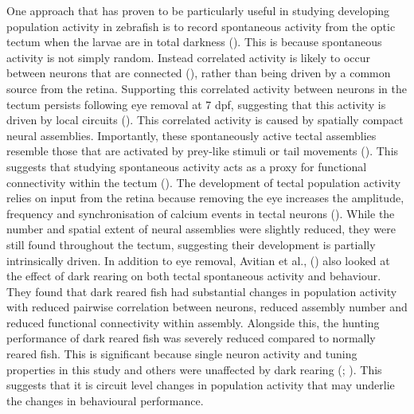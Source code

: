 One approach that has proven to be particularly useful in studying developing population activity in zebrafish is to record spontaneous activity from the optic tectum when the larvae are in total darkness (\cite{Romano2015, Avitan2017, Pietri2017}). This is because spontaneous activity is not simply random. Instead correlated activity is likely to occur between neurons that are connected (\cite{Marachlian2018PrinciplesTectum}), rather than being driven by a common source from the retina. Supporting this correlated activity between neurons in the tectum persists following eye removal at 7 dpf, suggesting that this activity is driven by local circuits (\cite{Romano2015}). This correlated activity is caused by spatially compact neural assemblies. Importantly, these spontaneously active tectal assemblies resemble those that are activated by prey-like stimuli or tail movements (\cite{Romano2015}). This suggests that studying spontaneous activity acts as a proxy for functional connectivity within the tectum (\cite{Marachlian2018PrinciplesTectum}). 
The development of tectal population activity relies on input from the retina because removing the eye increases the amplitude, frequency and synchronisation of calcium events in tectal neurons (\cite{Pietri2017}). While the number and spatial extent of neural assemblies were slightly reduced, they were still found throughout the tectum, suggesting their development is partially intrinsically driven. In addition to eye removal, Avitian et al.,  (\citeyear{Avitan2017}) also looked at the effect of dark rearing on both tectal spontaneous activity and behaviour. They found that dark reared fish had substantial changes in population activity with reduced pairwise correlation between neurons, reduced assembly number and reduced functional connectivity within assembly. Alongside this, the hunting performance of dark reared fish was severely reduced compared to normally reared fish. This is significant because single neuron activity and tuning properties in this study and others were unaffected by dark rearing (\cite{Avitan2017}; \cite{Niell2005FunctionalTectum}). This suggests that it is circuit level changes in population activity that may underlie the changes in behavioural performance. 

